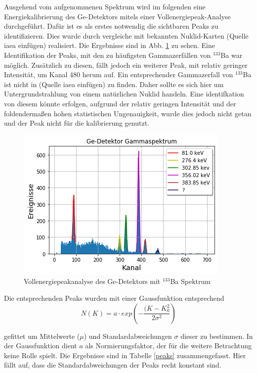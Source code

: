 Ausgehend vom aufgenommenen Spektrum wird im folgenden eine Energiekalibrierung des Ge-Detektors mitels einer Vollenergiepeak-Analyse durchgeführt.
Dafür ist es als erstes notwendig die sichtbaren Peaks zu identifizieren.
Dies wurde durch vergleiche mit bekannten Nuklid-Karten (Quelle iaea einfügen) realisiert.
Die Ergebnisse sind in Abb. \ref{GeKali} zu sehen.
Eine Identifikation der Peaks, mit den zu häufigsten Gammazerfällen von $^{133}$Ba war möglich.
Zusätzlich zu diesen, fällt jedoch ein weiterer Peak, mit relativ geringer Intensität, um Kanal 480 herum auf.
Ein entsprechender Gammazerfall von $^{133}$Ba ist nicht in (Quelle iaea einfügen) zu finden.
Daher sollte es sich hier um Untergrundstrahlung von einem natürlichen Nuklid handeln.
Eine identifkation von diesem könnte erfolgen, aufgrund der relativ geringen Intensität und der foldendermaßen hohen statistischen Ungenauigkeit, wurde dies jedoch nicht getan und der Peak nicht für die kalibrierung genutzt.

\begin{figure}[h]
  \includegraphics[width=\linewidth]{images/ba133Kali.png}
  \caption{Vollenergiepeakanalyse des Ge-Detektors mit $^{133}$Ba Spektrum}
  \label{GeKali}
\end{figure}

Die entsprechenden Peaks wurden mit einer Gaussfunktion entsprechend
\begin{equation}
N(K) = a \cdot exp \left( - \frac{(K - K_{0}^{2}}{2 \sigma ^{2}} \right)
\end{equation}


gefittet um Mittelwerte ($\mu$) und Standardabweichungen {$\sigma$} dieser zu bestimmen.
In der Gaussfunktion dient $a$ als Normierungsfaktor, der für die weitere Betrachtung keine Rolle spielt.
Die Ergebnisse sind in Tabelle \ref{peaks} zusammengefasst.
Hier fällt auf, dass die Standardabweichungen der Peaks recht konstant sind.


